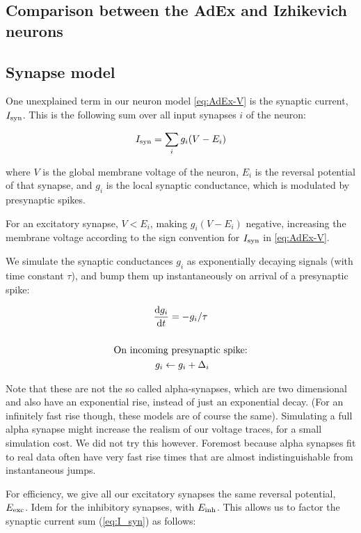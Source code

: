 \subsection{Comparison between the AdEx and Izhikevich neurons}


\subsection{Synapse model}
\label{sec:synapse_model}

One unexplained term in our neuron model \cref{eq:AdEx-V} is the synaptic current, $I_{\text{syn}}$.
This is the following sum over all input synapses $i$ of the neuron:

\begin{equation}
    I_{\text{syn}} = \sum_i g_i (V - E_i)
    \label{eq:I_syn}
\end{equation}

where $V$ is the global membrane voltage of the neuron, $E_i$ is the reversal potential of that synapse, and $g_i$ is the local synaptic conductance, which is modulated by presynaptic spikes.

For an excitatory synapse, $V < E_i$, making $g_i (V - E_i)$ negative, increasing the membrane voltage according to the sign convention for $I_{\text{syn}}$ in \cref{eq:AdEx-V}.

We simulate the synaptic conductances $g_i$ as exponentially decaying signals (with time constant $\tau$), and bump them up instantaneously on arrival of a presynaptic spike:

\begin{gather}
    \frac{\mathrm{d}g_i}{\mathrm{d}t} = -g_i / \tau
    \label{eq:g_i}
    \\\notag \\\notag
    \text{On incoming presynaptic spike:}\notag\\
    \ g_i \leftarrow g_i + \Delta_i
\end{gather}

Note that these are not the so called alpha-synapses, which are two dimensional and also have an exponential rise, instead of just an exponential decay. (For an infinitely fast rise though, these models are of course the same).
Simulating a full alpha synapse might increase the realism of our voltage traces, for a small simulation cost. We did not try this however. Foremost because alpha synapses fit to real data often have very fast rise times that are almost indistinguishable from instantaneous jumps.

For efficiency, we give all our excitatory synapses the same reversal potential, $E_{\text{exc}}$. Idem for the inhibitory synapses, with $E_{\text{inh}}$. This allows us to factor the synaptic current sum (\cref{eq:I_syn}) as follows:


